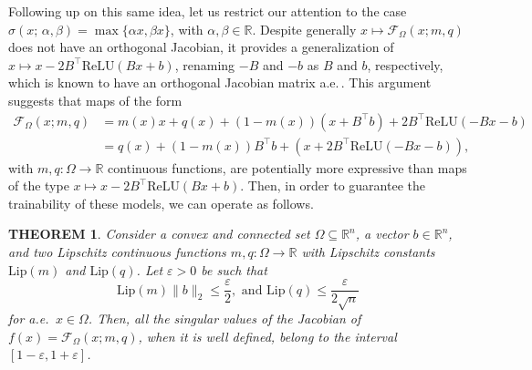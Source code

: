 \documentclass{article}
\newcommand{\R}{\mathbb{R}}
\theoremstyle{plain}
\newtheorem{theorem}{THEOREM}[section]
\theoremstyle{definition}
\theoremstyle{definition}
\theoremstyle{remark}
\theoremstyle{definition}
\theoremstyle{definition}
\theoremstyle{remark}
\numberwithin{equation}{section}
\begin{document}
Following up on this same idea, let us restrict our attention to the case $\sigma(x;\,\alpha,\beta) = \max\{\alpha x,\beta x\}$, with $\alpha,\beta\in\R$. Despite generally $x\mapsto \mathcal{F}_\Omega(x;m,q)$ does not have an orthogonal Jacobian, it provides a generalization of $x\mapsto x-2B^\top \mathrm{ReLU}(Bx+b)$, renaming $-B$ and $-b$ as $B$ and $b$, respectively, which is known to have an orthogonal Jacobian matrix a.e.\,. This argument suggests that maps of the form
\begin{align}
\mathcal{F}_\Omega(x;m,q) & = m(x)x+q(x) + (1-m(x))(x+B^\top b)+2B^\top \mathrm{ReLU}(-Bx-b)\label{eq:limit_layers}\\
&=q(x)+(1-m(x))B^\top b+\left( x + 2B^\top \mathrm{ReLU}(-Bx-b)\right),\nonumber
\end{align}
with $m,q:\Omega\to\R$ continuous functions, are potentially more expressive than maps of the type $x\mapsto x-2B^\top \mathrm{ReLU}(Bx+b)$. Then, in order to guarantee the trainability of these models, we can operate as follows.
\begin{theorem}\label{thm:dynIsometry}
Consider a convex and connected set $\Omega\subseteq\mathbb{R}^n$, a vector $b\in\mathbb{R}^n$, and two Lipschitz continuous functions $m,q:\Omega\to\mathbb{R}$ with Lipschitz constants $\mathrm{Lip}(m)$ and $\mathrm{Lip}(q)$. Let $\varepsilon > 0$ be such that
\[
\mathrm{Lip}(m)\|b\|_2 \leq \frac{\varepsilon}{2}, \text{ and } \mathrm{Lip}(q) \leq \frac{\varepsilon}{2\sqrt{n}}
\]
for a.e.\, $x\in\Omega$. Then, all the singular values of the Jacobian of $f(x)=\mathcal{F}_{\Omega}(x;m,q)$, when it is well defined, belong to the interval $[1-\varepsilon,1+\varepsilon]$.
\end{theorem}
\end{document}
